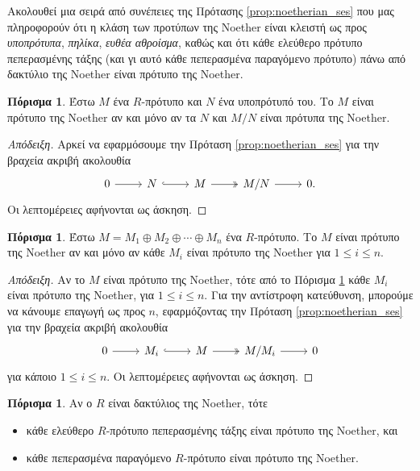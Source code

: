 \documentclass[12pt,a4paper,reqno]{amsart}
\theoremstyle{definition}
\newtheorem{corollary}[theorem]{Πόρισμα}
\theoremstyle{remark}
\numberwithin{theorem}{section}
\numberwithin{exercise}{section}
\numberwithin{equation}{section}
\begin{document}
Ακολουθεί μια σειρά από συνέπειες της Πρότασης \ref{prop:noetherian_ses} που μας πληροφορούν ότι η κλάση των προτύπων της Noether είναι κλειστή ως προς \emph{υποπρότυπα}, \emph{πηλίκα}, \emph{ευθέα αθροίσμα}, καθώς και ότι κάθε ελεύθερο πρότυπο πεπερασμένης τάξης (και γι αυτό κάθε πεπερασμένα παραγόμενο πρότυπο) πάνω από δακτύλιο της Noether είναι πρότυπο της Noether.
\begin{corollary}
    \label{cor:noether_fg}
    Έστω $M$ ένα $R$-πρότυπο και $N$ ένα υποπρότυπό του. Το $M$ είναι πρότυπο της Noether αν και μόνο αν τα $N$ και $M/N$ είναι πρότυπα της Noether.
\end{corollary}

\begin{proof}[Απόδειξη]
    Αρκεί να εφαρμόσουμε την Πρόταση \ref{prop:noetherian_ses} για την βραχεία ακριβή ακολουθία 
    \[
    \begin{tikzcd}
        0 \arrow[r] & N \arrow[r, hook] & M \arrow[r, two heads] & M/N \arrow[r] & 0.
    \end{tikzcd}
    \]
    Οι λεπτομέρειες αφήνονται ως άσκηση.
\end{proof}

\begin{corollary}
    \label{cor:noether_directSum}
    Έστω $M = M_1 \oplus M_2 \oplus \cdots \oplus M_n$ ένα $R$-πρότυπο. Το $M$ είναι πρότυπο της Noether αν και μόνο αν κάθε $M_i$ είναι πρότυπο της Noether για $1 \le i \le n$.
\end{corollary}

\begin{proof}[Απόδειξη]
    Αν το $M$ είναι πρότυπο της Noether, τότε από το Πόρισμα \ref{cor:noether_fg} κάθε $M_i$ είναι πρότυπο της Noether, για $1 \le i \le n$. Για την αντίστροφη κατεύθυνση, μπορούμε να κάνουμε επαγωγή ως προς $n$, εφαρμόζοντας την Πρόταση \ref{prop:noetherian_ses} για την βραχεία ακριβή ακολουθία
    \[
    \begin{tikzcd}
        0 \arrow[r] & M_i \arrow[r, hook] & M \arrow[r, two heads] & M/M_i \arrow[r] & 0
    \end{tikzcd}
    \] 
    για κάποιο $1 \le i \le n$. Οι λεπτομέρειες αφήνονται ως άσκηση.
\end{proof}

\begin{corollary}
\label{cor:noether_free}
Αν ο $R$ είναι δακτύλιος της Noether, τότε
\begin{itemize}
    \item[(1)] κάθε ελεύθερο $R$-πρότυπο πεπερασμένης τάξης είναι πρότυπο της Noether, και
    \item[(2)] κάθε πεπερασμένα παραγόμενο $R$-πρότυπο είναι πρότυπο της Noether.
\end{itemize} 
\end{corollary}
\end{document}
